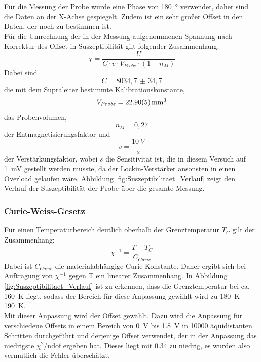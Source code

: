 \documentclass[12pt,a4paper]{article}
\begin{document}
Für die Messung der Probe wurde eine Phase von \SI{180}{\degree} verwendet, daher sind die Daten an der X-Achse gespiegelt. Zudem ist ein sehr großer Offset in den Daten, der noch zu bestimmen ist. \\
Für die Umrechnung der in der Messung aufgenommenen Spannung nach Korrektur des Offset in Suszeptibilität gilt folgender Zusammenhang:
\begin{equation*}
\chi = \dfrac{U}{C \cdot v \cdot V_{Probe} \cdot (1-n_M)}
\end{equation*}
Dabei sind
\begin{equation*}
C = 8034,7 \, \pm \, 34,7
\end{equation*}
die mit dem Supraleiter bestimmte Kalibrationskonstante, 
\begin{equation*}
V_{Probe} = \SI{22,90 \pm 0,05}{mm^3}
\end{equation*}
das Probenvolumen,
\begin{equation*}
n_M = 0,27
\end{equation*}
der Entmagnetisierungsfaktor und 
\begin{equation*}
v = \dfrac{\SI{10}{V}}{s}
\end{equation*}
der Verstärkungsfaktor, wobei $s$ die Sensitivität ist, die in diesem Versuch auf \SI{1}{mV} gestellt werden musste, da der Lockin-Verstärker ansonsten in einen Overload gelaufen wäre. Abbildung \ref{fig:Suszeptibilitaet_Verlauf} zeigt den Verlauf der Suszeptibilität der Probe über die gesamte Messung. 

\subsubsection{Curie-Weiss-Gesetz}
Für einen Temperaturbereich deutlich oberhalb der Grenztemperatur $T_C$ gilt der Zusammenhang:
\begin{equation*}
\chi ^{-1} = \dfrac{T - T_C}{C_{Curie}}
\end{equation*}
Dabei ist $C_{Curie}$ die materialabhängige Curie-Konstante. Daher ergibt sich bei Auftragung von $\chi ^{-1}$ gegen T ein linearer Zusammenhang. In Abbildung \ref{fig:Suszeptibilitaet_Verlauf} ist zu erkennen, dass die Grenztemperatur bei ca. \SI{160}{K} liegt, sodass der Bereich für diese Anpassung gewählt wird zu \SI{180}{K} - \SI{190}{K}. \\
Mit dieser Anpassung wird der Offset gewählt. Dazu wird die Anpassung für verschiedene Offsets in einem Bereich von \SI{0}{V} bis \SI{1,8}{V} in 10000 äquidistanten Schritten durchgeführt und derjenige Offset verwendet, der in der Anpassung das niedrigste $\chi ^2$/ndof ergeben hat. Dieses liegt mit 0.34 zu niedrig, es wurden also vermutlich die Fehler überschätzt.
\end{document}
